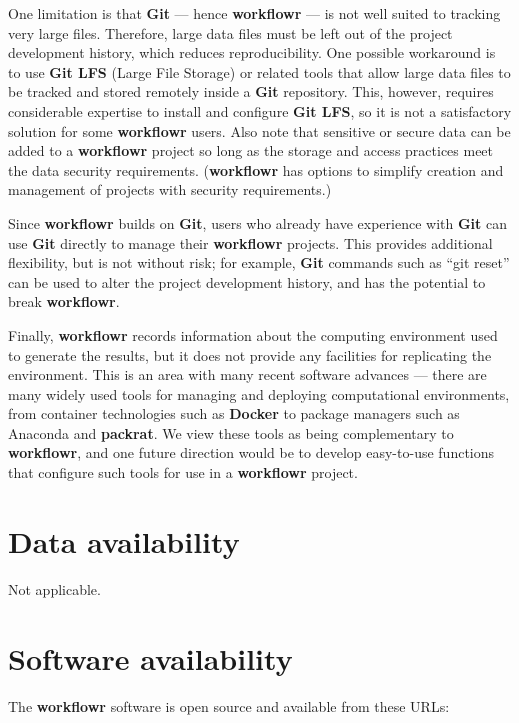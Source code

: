 \documentclass[9pt,a4paper]{extarticle}
\begin{document}
One limitation is that \textbf{Git} --- hence \textbf{workflowr} --- is not well suited to
tracking very large files. Therefore, large data files must be left out
of the project development history, which reduces reproducibility. One
possible workaround is to use \textbf{Git LFS} (Large File Storage) or related
tools that allow large data files to be tracked and stored remotely
inside a \textbf{Git} repository. This, however, requires considerable expertise
to install and configure \textbf{Git LFS}, so it is not a satisfactory solution
for some \textbf{workflowr} users. Also note that sensitive or secure data can be
added to a \textbf{workflowr} project so long as the storage and access practices
meet the data security requirements.  (\textbf{workflowr} has options to simplify
creation and management of projects with security requirements.)

Since \textbf{workflowr} builds on \textbf{Git}, users who already have experience with
 \textbf{Git} can use \textbf{Git} directly to manage their \textbf{workflowr} projects. This
provides additional flexibility, but is not without risk; for example,
 \textbf{Git} commands such as “git reset” can be used to alter the project
development history, and has the potential to break \textbf{workflowr}.

Finally, \textbf{workflowr} records information about the computing environment
used to generate the results, but it does not provide any facilities for
replicating the environment. This is an area with many recent software
advances --- there are many widely used tools for managing and deploying
computational environments, from container technologies such as \textbf{Docker}
to package managers such as Anaconda and \textbf{packrat}. We view these tools as
being complementary to \textbf{workflowr}, and one future direction would be to
develop easy-to-use functions that configure such tools for use in a
 \textbf{workflowr} project.


\section*{Data availability}

Not applicable.


\section*{Software availability}

The \textbf{workflowr} software is open source and available from these URLs:
\end{document}
